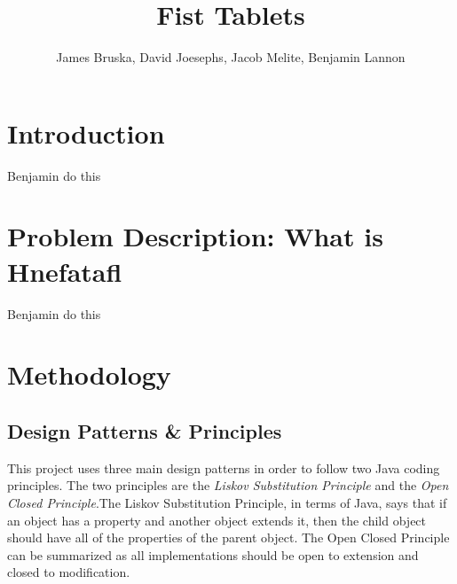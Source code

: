 \documentclass{article}
\title{Fist Tablets}
\author{James Bruska, David Joesephs, Jacob Melite, Benjamin Lannon}
\begin{document}
\maketitle
\tableofcontents

\section{Introduction}
Benjamin do this

\section{Problem Description: What is Hnefatafl}
Benjamin do this

\section{Methodology}

\subsection{Design Patterns \& Principles}
	This project uses three main design patterns in order to follow two Java coding principles. The two principles are the \textit{Liskov Substitution Principle} and the \textit{Open Closed Principle}.The Liskov Substitution Principle, in terms of Java, says that if an object has a property and another object extends it, then the child object should have all of the properties of the parent object. The Open Closed Principle can be summarized as all implementations should be open to extension and closed to modification.
\end{document}
